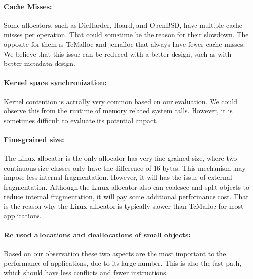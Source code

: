 \paragraph{Cache Misses:} Some allocators, such as DieHarder, Hoard, and  OpenBSD, have multiple cache misses per operation. That could sometime be the reason for their slowdown. The opposite for them is TcMalloc and jemalloc that always have fewer cache misses. We believe that this issue can be reduced with a better design, such as with better metadata design.  

\paragraph{Kernel space synchronization:} Kernel contention is actually very common based on our evaluation. We could observe this from the runtime of memory related system calls.  However, it is sometimes difficult to evaluate its potential impact.

\paragraph{Fine-grained size:} The Linux allocator is the only allocator has very fine-grained size, where two continuous size classes only have the difference of 16 bytes. This mechanism may impose less internal fragmentation. However, it will has the issue of external fragmentation. Although the Linux allocator also can coalesce and split objects to reduce internal fragmentation, it will pay some additional performance cost. That is the reason why the Linux allocator is typically slower than TcMalloc for most applications.

\paragraph{Re-used allocations and deallocations of small objects:} Based on our observation these two aspects are the most important to the  performance of applications, due to its large number. This is also the fast path, which should have less conflicts and fewer instructions.  
